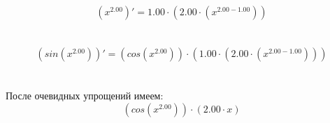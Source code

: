 \documentclass{article}
\begin{document}
$$({x}^{2.00})' = 1.00 \cdot (2.00 \cdot ({x}^{2.00 - 1.00}))$$\\\\
$$(sin({x}^{2.00}))' = (cos({x}^{2.00})) \cdot (1.00 \cdot (2.00 \cdot ({x}^{2.00 - 1.00})))$$\\\\
После очевидных упрощений имеем:
$$(cos({x}^{2.00})) \cdot (2.00 \cdot x)$$\\\\
\end{document}
